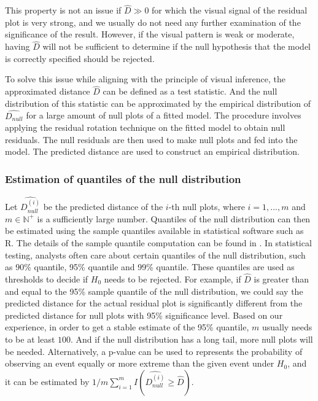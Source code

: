 \documentclass[]{interact}
\theoremstyle{plain}%
\theoremstyle{definition}
\theoremstyle{remark}
\begin{document}
This property is not an issue if \(\hat{D} \gg 0\) for which the visual
signal of the residual plot is very strong, and we usually do not need
any further examination of the significance of the result. However, if
the visual pattern is weak or moderate, having \(\hat{D}\) will not be
sufficient to determine if the null hypothesis that the model is
correctly specified should be rejected.

To solve this issue while aligning with the principle of visual
inference, the approximated distance \(\hat{D}\) can be defined as a
test statistic. And the null distribution of this statistic can be
approximated by the empirical distribution of \(\widehat{D_{null}}\) for
a large amount of null plots of a fitted model. The procedure involves
applying the residual rotation technique \citep{buja2009statistical} on
the fitted model to obtain null residuals. The null residuals are then
used to make null plots and fed into the model. The predicted distance
are used to construct an empirical distribution.

\hypertarget{estimation-of-quantiles-of-the-null-distribution}{%
\subsubsection{Estimation of quantiles of the null
distribution}\label{estimation-of-quantiles-of-the-null-distribution}}

Let \(\widehat{D_{null}^{(i)}}\) be the predicted distance of the
\(i\)-th null plots, where \(i = 1,...,m\) and \(m \in \mathbb{N}^+\) is
a sufficiently large number. Quantiles of the null distribution can then
be estimated using the sample quantiles available in statistical
software such as R. The details of the sample quantile computation can
be found in \citet{hyndman1996sample}. In statistical testing, analysts
often care about certain quantiles of the null distribution, such as
90\% quantile, 95\% quantile and 99\% quantile. These quantiles are used
as thresholds to decide if \(H_0\) needs to be rejected. For example, if
\(\hat{D}\) is greater than and equal to the 95\% sample quantile of the
null distribution, we could say the predicted distance for the actual
residual plot is significantly different from the predicted distance for
null plots with 95\% significance level. Based on our experience, in
order to get a stable estimate of the 95\% quantile, \(m\) usually needs
to be at least \(100\). And if the null distribution has a long tail,
more null plots will be needed. Alternatively, a p-value can be used to
represents the probability of observing an event equally or more extreme
than the given event under \(H_0\), and it can be estimated by
\(1/m\sum_{i=1}^{m}I\left(\widehat{D_{null}^{(i)}} \geq \hat{D}\right)\).
\end{document}
